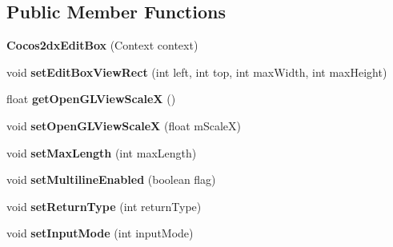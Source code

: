 \subsection*{Public Member Functions}
\begin{DoxyCompactItemize}
\item 
\mbox{\label{classorg_1_1cocos2dx_1_1lib_1_1Cocos2dxEditBox_ad70484f13e1482147cc885f086e94e1d}} 
{\bfseries Cocos2dx\+Edit\+Box} (Context context)
\item 
\mbox{\label{classorg_1_1cocos2dx_1_1lib_1_1Cocos2dxEditBox_aedf5d4cd6c912debf2c7364f1dd1827a}} 
void {\bfseries set\+Edit\+Box\+View\+Rect} (int left, int top, int max\+Width, int max\+Height)
\item 
\mbox{\label{classorg_1_1cocos2dx_1_1lib_1_1Cocos2dxEditBox_a13e14bdb44883e31616fbd224a1c2560}} 
float {\bfseries get\+Open\+G\+L\+View\+ScaleX} ()
\item 
\mbox{\label{classorg_1_1cocos2dx_1_1lib_1_1Cocos2dxEditBox_a1df068f07961e7fac0dc1983b53015d2}} 
void {\bfseries set\+Open\+G\+L\+View\+ScaleX} (float m\+ScaleX)
\item 
\mbox{\label{classorg_1_1cocos2dx_1_1lib_1_1Cocos2dxEditBox_abda6f3fa4bf8a4481583aa9f68983fea}} 
void {\bfseries set\+Max\+Length} (int max\+Length)
\item 
\mbox{\label{classorg_1_1cocos2dx_1_1lib_1_1Cocos2dxEditBox_aa1a22ef0a71fdd572bd5f19ab7abe128}} 
void {\bfseries set\+Multiline\+Enabled} (boolean flag)
\item 
\mbox{\label{classorg_1_1cocos2dx_1_1lib_1_1Cocos2dxEditBox_a0ceecc237a28284160a9048a67577e29}} 
void {\bfseries set\+Return\+Type} (int return\+Type)
\item 
\mbox{\label{classorg_1_1cocos2dx_1_1lib_1_1Cocos2dxEditBox_a8c5988624f8d0847cac4954f1a60c3e9}} 
void {\bfseries set\+Input\+Mode} (int input\+Mode)

\end{DoxyCompactItemize}
